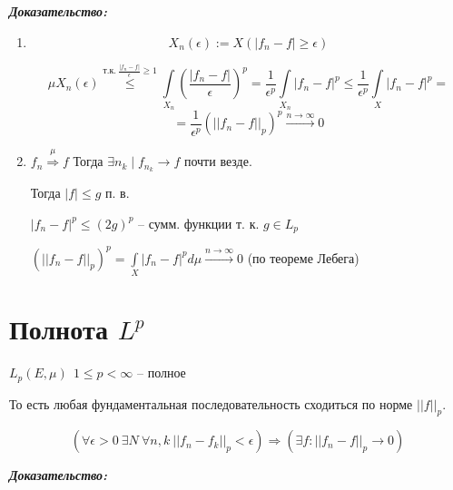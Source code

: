 \documentclass[paper=a4, fontsize=14pt]{report}
\begin{document}
\textbf{\emph{Доказательство:}}

\begin{enumerate}
	\item $$ X_n(\epsilon) := X(|f_n - f| \geq \epsilon) $$

	$$ \mu X_n(\epsilon) \overset{\text{т.к.}\ \frac{|f_n-f|}{\epsilon} \geq 1}{\leqslant} \int\limits_{X_n} (\frac{|f_n - f|}{\epsilon})^p  =
	\frac{1}{\epsilon^p} \int\limits_{X_n} |f_n - f|^p \leq
	\frac{1}{\epsilon^p} \int\limits_{X} |f_n - f|^p = $$
	$$ = \frac{1}{\epsilon^p} (||f_n - f||_p)^p \stackrel{n \rightarrow \infty}{\rightarrow} 0$$

	\item $ f_n \stackrel{\mu}{\Rightarrow} f $ Тогда $ \exists n_k \mid f_{n_k} \rightarrow f $ почти везде.

	Тогда $ |f| \leq g $ п. в.

	$ |f_n - f|^p \leq (2g)^p $ -- сумм. функции т. к. $ g \in L_p $

	$ (||f_n - f||_p)^p = \int\limits_{X} |f_n - f|^p d\mu \stackrel{n \rightarrow \infty}{\rightarrow} 0 $ (по теореме Лебега)

\end{enumerate}

\section{Полнота $L^p$}
$ L_p(E, \mu) ~ ~ 1 \leq p < \infty $ -- полное

То есть любая фундаментальная последовательность сходиться по норме $ ||f||_p $.

$$(\forall \epsilon > 0 ~ \exists N ~ \forall n, k ~ ||f_n - f_k||_p < \epsilon) \Rightarrow (\exists f : ||f_n - f||_p \rightarrow 0)$$


\textbf{\emph{Доказательство:}}
\end{document}
